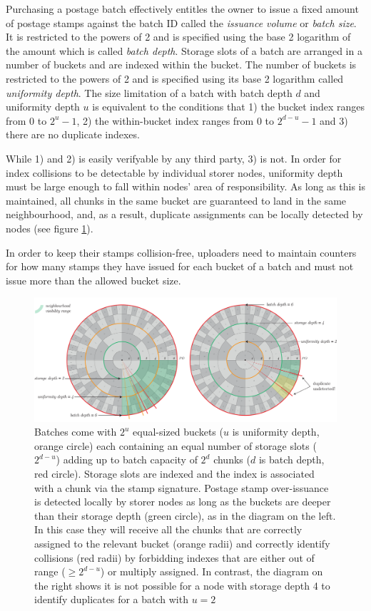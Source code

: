 Purchasing a postage batch effectively entitles the owner to issue a fixed amount of postage stamps against the batch ID called the \emph{issuance volume} or \emph{batch size}. It is restricted to the powers of 2 and is specified using the base 2 logarithm of the amount which is called \emph{batch depth}. Storage slots of a batch are arranged in a number of buckets and are indexed within the bucket. The number of buckets is restricted to the powers of 2 and is specified using its base 2 logarithm called \emph{uniformity depth}. The size limitation of a batch with batch depth $d$ and uniformity depth $u$ is equivalent to the conditions that 1) the bucket index ranges from 0 to $2^u-1$, 2) the within-bucket index ranges  from 0 to $2^{d-u}-1$ and 3) there are no duplicate indexes.  

While 1) and 2) is easily verifyable by any third party, 3) is not.
In order for index collisions to be detectable by individual storer nodes, uniformity depth must be large enough to fall within nodes' area of responsibility.
As long as this is maintained, all chunks in the same bucket are guaranteed to land in the same neighbourhood, and, as a result, duplicate assignments can be locally detected by nodes (see figure \ref{fig:over-issuance}).

In order to keep their stamps collision-free, uploaders need to maintain counters for how many stamps they have issued for each bucket of a batch and must not issue more than the allowed bucket size. 

\begin{figure}[!ht]
  \centering
    \includegraphics[width=1\textwidth]{fig/batch-structure.pdf}
  \caption[Batch structure, uniformity and over-issuance]{Batches come with $2^u$ equal-sized buckets ($u$ is uniformity depth, orange circle) each containing an equal number of storage slots ($2^{d-u}$) adding up to batch capacity of $2^d$ chunks ($d$ is batch depth, red circle). Storage slots are indexed and the index is associated with a chunk via the stamp signature. Postage stamp over-issuance is detected locally by storer nodes as long as the buckets are deeper than their storage depth (green circle), as in the diagram on the left. In this case they will receive all the chunks that are correctly assigned to the relevant bucket (orange radii) and correctly identify collisions (red radii) by forbidding indexes that are either out of range ($\geq 2^{d-u}$) or multiply assigned. In contrast, the diagram on the right shows it is not possible for a node with storage depth 4 to identify duplicates for a batch with $u=2$}
\label{fig:over-issuance}
\end{figure}    




